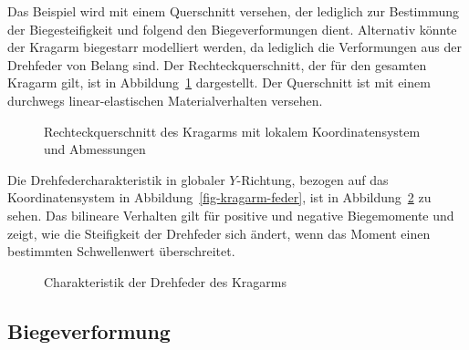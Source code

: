 \documentclass[
  11pt,
  letterpaper,
]{scrreprt}
\begin{document}
Das Beispiel wird mit einem Querschnitt versehen, der lediglich zur
Bestimmung der Biegesteifigkeit und folgend den Biegeverformungen dient.
Alternativ könnte der Kragarm biegestarr modelliert werden, da lediglich
die Verformungen aus der Drehfeder von Belang sind. Der
Rechteckquerschnitt, der für den gesamten Kragarm gilt, ist in
Abbildung~\ref{fig-qs-kragarm} dargestellt. Der Querschnitt ist mit
einem durchwegs linear-elastischen Materialverhalten versehen.

\begin{figure}[H]


\caption{\label{fig-qs-kragarm}Rechteckquerschnitt des Kragarms mit
lokalem Koordinatensystem und Abmessungen}

\end{figure}%

Die Drehfedercharakteristik in globaler \(Y\)-Richtung, bezogen auf das
Koordinatensystem in Abbildung~\ref{fig-kragarm-feder}, ist in
Abbildung~\ref{fig-springcharacteristic} zu sehen. Das bilineare
Verhalten gilt für positive und negative Biegemomente und zeigt, wie die
Steifigkeit der Drehfeder sich ändert, wenn das Moment einen bestimmten
Schwellenwert überschreitet.

\begin{figure}[H]


\caption{\label{fig-springcharacteristic}Charakteristik der Drehfeder
des Kragarms}

\end{figure}%

\subsection{Biegeverformung}\label{biegeverformung}
\end{document}
